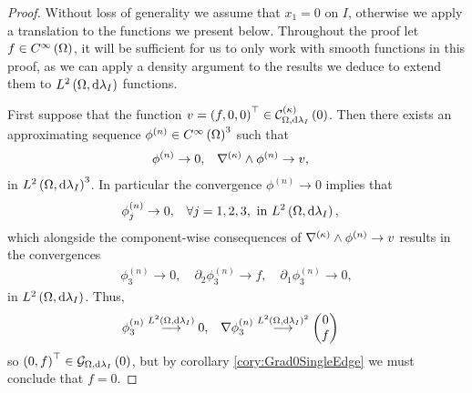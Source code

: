 \begin{proof}
	Without loss of generality we assume that $x_1=0$ on $I$, otherwise we apply a translation to the functions we present below.
	Throughout the proof let $f\in C^{\infty}\left( \Omega \right)$, it will be sufficient for us to only work with smooth functions in this proof, as we can apply a density argument to the results we deduce to extend them to $L^{2}\left( \Omega,\mathrm{d}\lambda_I \right)$ functions. \newline
	
	First suppose that the function $v=\left( f,0,0 \right)^{\top}\in\mathcal{C}_{ \Omega, \mathrm{d}\lambda_I}^{(\kappa)}\left( 0 \right)$.
	Then there exists an approximating sequence $\phi^{(n)}\in C^{\infty}\left( \Omega \right)^3$ such that
	\begin{align*}
		\phi^{(n)} \rightarrow 0, 
		&\quad \nabla_{}^{(\kappa)}\wedge\phi^{(n)} \rightarrow v,
	\end{align*}
	in $L^{2}\left( \Omega,\mathrm{d}\lambda_I \right)^3$.
	In particular the convergence $\phi^{(n)} \rightarrow 0$ implies that
	\begin{align*}
		\phi^{(n)}_j \rightarrow 0, &\quad\forall j=1,2,3, \text{ in } L^{2}\left( \Omega,\mathrm{d}\lambda_I \right),
	\end{align*}
	which alongside the component-wise consequences of $\nabla_{}^{(\kappa)}\wedge\phi^{(n)} \rightarrow v$ results in the convergences
	\begin{align*}
		\phi^{(n)}_3 \rightarrow 0, \quad \partial_2\phi^{(n)}_3\rightarrow f, \quad \partial_1\phi^{(n)}_3 \rightarrow 0,
	\end{align*}
	in $L^{2}\left( \Omega,\mathrm{d}\lambda_I \right)$.
	Thus,
	\begin{align*}
		\phi^{(n)}_3 \overset{L^{2}\left( \Omega,\mathrm{d}\lambda_I \right)}{\longrightarrow} 0, 
		&\quad \nabla\phi^{(n)}_3 \overset{L^{2}\left( \Omega,\mathrm{d}\lambda_I \right)^2}{\longrightarrow} \begin{pmatrix} 0 \\ f \end{pmatrix}
	\end{align*}
	so $\left( 0,f \right)^{\top}\in\mathcal{G}_{ \Omega, \mathrm{d}\lambda_I}\left( 0 \right)$, but by corollary \ref{cory:Grad0SingleEdge} we must conclude that $f=0$. \newline
	

\end{proof}
